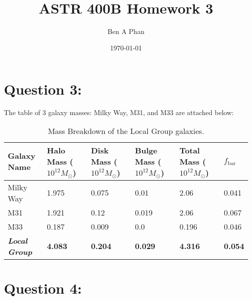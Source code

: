 \documentclass{article}
\begin{document}
\title{ASTR 400B Homework 3}
\author{Ben A Phan}
\date{\today}
\maketitle

\section*{Question 3:}
The table of 3 galaxy masses: Milky Way, M31, and M33 are attached below:

\begin{table}[h]
    \centering
    \renewcommand{\arraystretch}{1.2}
    \setlength{\tabcolsep}{8pt}
    \begin{tabularx}{\textwidth}{lXXXXX} 
        \toprule
        \textbf{Galaxy Name} & 
        \textbf{Halo Mass} ($10^{12} M_{\odot}$) & 
        \textbf{Disk Mass} ($10^{12} M_{\odot}$) & 
        \textbf{Bulge Mass} ($10^{12} M_{\odot}$) & 
        \textbf{Total Mass} ($10^{12} M_{\odot}$) &
        \textbf{\( f_{\text{bar}}\)} \\
        \midrule
         Milky Way & 1.975 & 0.075 & 0.01 & 2.06 & 0.041   \\
         M31 & 1.921 & 0.12 & 0.019 & 2.06 & 0.067 \\
         M33 & 0.187 & 0.009 & 0.0 & 0.196 & 0.046 \\
        \midrule
        \textbf{\textit{Local Group}} & \textbf{4.083} & \textbf{0.204} & \textbf{0.029} & \textbf{4.316} & \textbf{0.054} \\
        \bottomrule
    \end{tabularx}
    \caption{Mass Breakdown of the Local Group galaxies.}
    \label{tab:my_label}
\end{table}

\section*{Question 4:}
\end{document}
